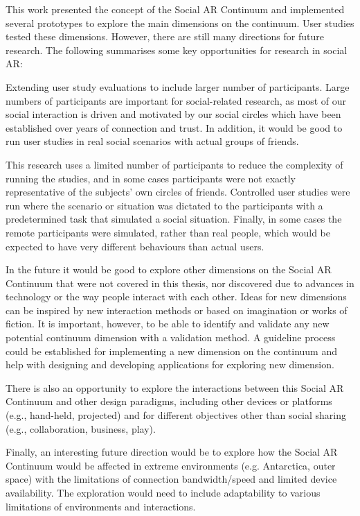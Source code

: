 This work presented the concept of the Social AR Continuum and implemented several prototypes to explore the main dimensions on the continuum. User studies tested these dimensions. However, there are still many directions for future research. The following summarises some key opportunities for research in social AR:  

Extending user study evaluations to include larger number of participants. Large numbers of participants are important for social-related research, as most of our social interaction is driven and motivated by our social circles which have been established over years of connection and trust.  In addition, it would be good to run user studies in real social scenarios with actual groups of friends.

This research uses a limited number of participants to reduce the complexity of running the studies, and in some cases participants were not exactly representative of the subjects' own circles of friends. Controlled user studies were run where the scenario or situation was dictated to the participants with a predetermined task that simulated a social situation. Finally, in some cases the remote participants were simulated, rather than real people, which would be expected to have very different behaviours than actual users.

In the future it would be good to explore other dimensions on the Social AR Continuum that were not covered in this thesis, nor discovered due to advances in technology or the way people interact with each other. Ideas for new dimensions can be inspired by new interaction methods or based on imagination or works of fiction. It is important, however, to be able to identify and validate any new potential continuum dimension with a validation method. A guideline process could be established for implementing a new dimension on the continuum and help with designing and developing applications for exploring new dimension. 

There is also an opportunity to explore the interactions between this Social AR Continuum and other design paradigms, including other devices or platforms (e.g., hand-held, projected) and for different objectives other than social sharing (e.g., collaboration, business, play).

Finally, an interesting future direction would be to explore how the Social AR Continuum would be affected in extreme environments (e.g. Antarctica, outer space) with the limitations of connection bandwidth/speed and limited device availability. The exploration would need to include adaptability to various limitations of environments and interactions. 

